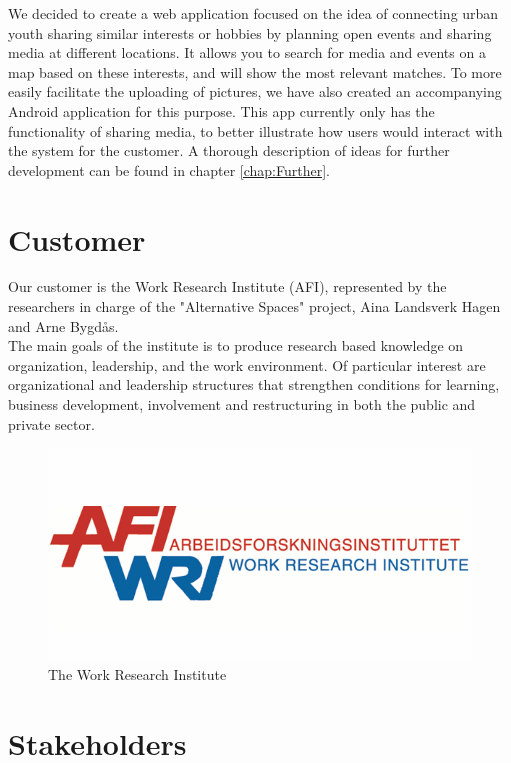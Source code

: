 We decided to create a web application focused on the idea of connecting urban youth sharing similar interests or hobbies by planning open events and sharing media at different locations. It allows you to search for media and events on a map based on these interests, and will show the most relevant matches. To more easily facilitate the uploading of pictures, we have also created an accompanying Android application for this purpose. This app currently only has the functionality of sharing media, to better illustrate how users would interact with the system for the customer. A thorough description of ideas for further development can be found in chapter \ref{chap:Further}.


\section{Customer}
\label{sec:IntroCustomer}

Our customer is the Work Research Institute (AFI), represented by the researchers in charge of the "Alternative Spaces" project, Aina Landsverk Hagen and Arne Bygdås. \\
The main goals of the institute is to produce research based knowledge on organization, leadership, and the work environment. Of particular interest are organizational and leadership structures that strengthen conditions for learning, business development, involvement and restructuring in both the public and private sector.

\begin{figure}[ht!]
\centering
\includegraphics[width=\linewidth]{./Introduction/img/afi}
\caption{The Work Research Institute \label{fig:IntroAfi}}
\end{figure}

\section{Stakeholders}
\label{sec:IntroStakeholders}

